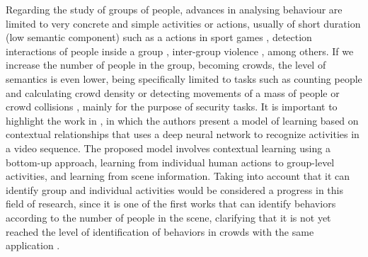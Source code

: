 Regarding the study of groups of people, advances in analysing behaviour are limited to very concrete and simple activities or actions, usually of short duration (low semantic component) such as a actions in sport games \cite{rahmad2018survey,chen2021lstm,muhammad2021human,ullah2021attention}, detection interactions of people inside a group \cite{wu2021comprehensive, deng2016structure,wang2017recurrent}, inter-group violence \cite{su2021deep, yao2021survey,ye2021campus}, among others. If we increase the number of people in the group, becoming crowds, the level of semantics is even lower, being specifically limited to tasks such as counting people and calculating crowd density \cite{ying2021survey, jingying2021survey,fan2022survey,bendali2021recent} or detecting movements of a mass of people or crowd collisions \cite{hao2019effective, nayan2019detecting, shehab2019statistical, zhang2019detection}, mainly for the purpose of security tasks. It is important to highlight the work in \cite{VAHORA201947}, in which the authors present a model of learning based on contextual relationships that uses a deep neural network to recognize activities in a video sequence. The proposed model involves contextual learning using a bottom-up approach, learning from individual human actions to group-level activities, and learning from scene information. Taking into account that it can identify group and individual activities would be considered a progress in this field of research, since it is one of the first works that can identify behaviors according to the number of people in the scene, clarifying that it is not yet reached the level of identification of behaviors in crowds with the same application \cite{VAHORA201947,vishwakarma2015human}.

